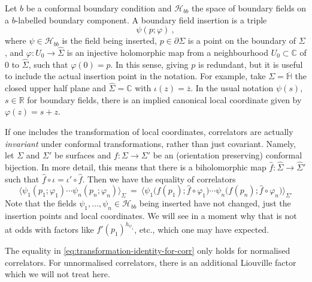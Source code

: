 \documentclass[11pt,a4paper]{article}
\numberwithin{equation}{section}
\begin{document}
Let $b$ be a conformal boundary condition and $\mathcal{H}_{bb}$ the space of boundary fields on a $b$-labelled boundary component. A boundary field insertion is a triple
\begin{equation}
	\psi(p;\varphi) ~,
\end{equation}
where $\psi \in \mathcal{H}_{bb}$ is the field being inserted, $p \in \partial\Sigma$ is a point on the boundary of $\Sigma$, and $\varphi : U_0 \to \widehat\Sigma$ is an injective holomorphic map from a neighbourhood $U_0 \subset \mathbb{C}$ of $0$ to $\widehat\Sigma$, such that $\varphi(0)=p$.
In this sense, giving $p$ is redundant, but it is useful to include the actual insertion point in the notation.
For example, take $\Sigma = \overline{\mathbb{H}}$ the closed upper half plane and $\widehat\Sigma = \mathbb{C}$ with $\iota(z)=\overline z$. In the usual notation $\psi(s)$, $s\in \mathbb{R}$ for boundary fields, there is an implied canonical local coordinate given by $\varphi(z) = s+z$.

If one includes the transformation of local coordinates, correlators are actually \textit{invariant} under conformal transformations, rather than just covariant. Namely, let $\Sigma$ and $\Sigma'$ be surfaces and $f : \Sigma \to \Sigma'$ be an (orientation preserving) conformal bijection. In more detail, this means that there is a biholomorphic map $\widehat f : \widehat \Sigma \to \widehat \Sigma'$ such that $\widehat f \circ \iota = \iota' \circ \widehat f$. Then we have the equality of correlators
\begin{equation}\label{eq:transformation-identity-for-corr}
\big\langle 
\psi_1(p_1;\varphi_1) \cdots
\psi_n(p_n;\varphi_n) \big\rangle_{\Sigma}
~=~
\big\langle 
\psi_1\big(f(p_1);\widehat f \circ \varphi_1\big) \cdots
\psi_n\big(f(p_n);\widehat f \circ \varphi_n\big) \big\rangle_{\Sigma'}
\end{equation}
Note that the fields $\psi_1,\dots,\psi_n \in \mathcal{H}_{bb}$ being inserted have not changed, just the insertion points and local coordinates. We will see in a moment why that is not at odds with factors like $f'(p_1)^{h_{\psi_1}}$, etc., which one may have expected. 

The equality in \eqref{eq:transformation-identity-for-corr} only holds for normalised correlators. For unnormalised correlators, there is an additional Liouville factor which we will not treat here.

\medskip
\end{document}
